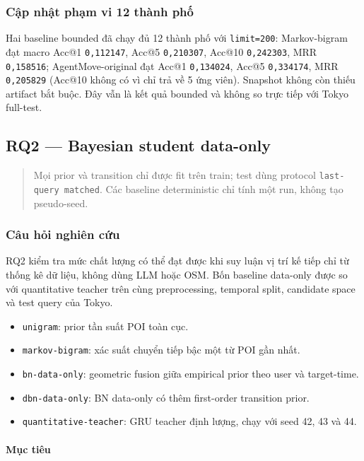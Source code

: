 \subsubsection*{Cập nhật phạm vi 12 thành phố}

Hai baseline bounded đã chạy đủ 12 thành phố với \texttt{limit=200}: Markov-bigram đạt macro Acc@1 \texttt{0,112147}, Acc@5 \texttt{0,210307}, Acc@10 \texttt{0,242303}, MRR \texttt{0,158516}; AgentMove-original đạt Acc@1 \texttt{0,134024}, Acc@5 \texttt{0,334174}, MRR \texttt{0,205829} (Acc@10 không có vì chỉ trả về 5 ứng viên). Snapshot không còn thiếu artifact bắt buộc. Đây vẫn là kết quả bounded và không so trực tiếp với Tokyo full-test.


\subsection{RQ2 --- Bayesian student data-only}

\begin{quote}\small Mọi prior và transition chỉ được fit trên train; test dùng protocol \texttt{last-query matched}. Các baseline deterministic chỉ tính một run, không tạo pseudo-seed.\end{quote}
\subsubsection*{Câu hỏi nghiên cứu}

RQ2 kiểm tra mức chất lượng có thể đạt được khi suy luận vị trí kế tiếp chỉ từ thống kê dữ liệu, không dùng LLM hoặc OSM. Bốn baseline data-only được so với quantitative teacher trên cùng preprocessing, temporal split, candidate space và test query của Tokyo.

\begin{itemize}
\item \texttt{unigram}: prior tần suất POI toàn cục.
\item \texttt{markov-bigram}: xác suất chuyển tiếp bậc một từ POI gần nhất.
\item \texttt{bn-data-only}: geometric fusion giữa empirical prior theo user và target-time.
\item \texttt{dbn-data-only}: BN data-only có thêm first-order transition prior.
\item \texttt{quantitative-teacher}: GRU teacher định lượng, chạy với seed 42, 43 và 44.
\end{itemize}

\paragraph{Mục tiêu}

